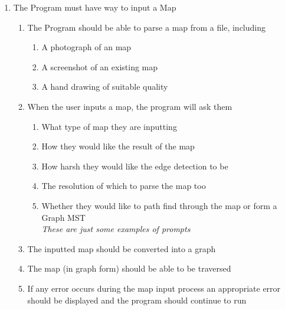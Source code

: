 \begin{flushleft}
        \begin{enumerate}
            \item The Program must have way to input a Map
            \begin{enumerate}
                \item The Program should be able to parse a map from a file, including
                \begin{enumerate}
                    \item A photograph of an map
                    \item A screenshot of an existing map
                    \item A hand drawing of suitable quality
                \end{enumerate}
                \item When the user inputs a map, the program will ask them
                \begin{enumerate}
                    \item What type of map they are inputting
                    \item How they would like the result of the map
                    \item How harsh they would like the edge detection to be
                    \item The resolution of which to parse the map too
                    \item Whether they would like to path find through the map or form a Graph MST \\
                    \emph{These are just some examples of prompts}
                \end{enumerate}
                \item The inputted map should be converted into a graph
                \item The map (in graph form) should be able to be traversed
                \item If any error occurs during the map input process an appropriate error should be displayed and the program should continue to run
            \end{enumerate}
            

\end{enumerate}
\end{flushleft}
